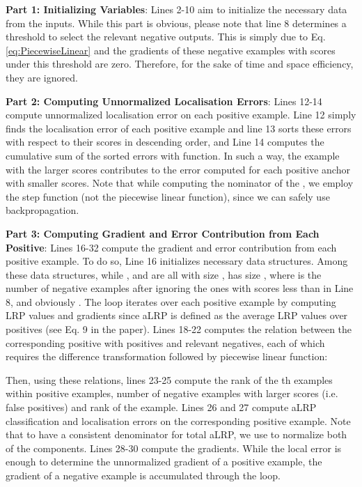 \documentclass{article}
\begin{document}
\textbf{Part 1: Initializing Variables}: Lines 2-10  aim to initialize the necessary data from the inputs. While this part is obvious, please note that line 8 determines a threshold to select the relevant negative outputs. This is simply due to Eq. \ref{eq:PiecewiseLinear} and the gradients of these negative examples with scores under this threshold are zero. Therefore, for the sake of time and space efficiency, they are ignored.

\textbf{Part 2: Computing Unnormalized Localisation Errors}: Lines 12-14 compute unnormalized localisation error on each positive example. Line 12 simply finds the localisation error of each positive example and line 13 sorts these errors with respect to their scores in descending order, and Line 14 computes the cumulative sum of the sorted errors with  function. In such a way, the example with the larger scores contributes to the error computed for each positive anchor with smaller scores. Note that while computing the nominator of the , we employ the step function (not the piecewise linear function), since we can safely use backpropagation. 

\textbf{Part 3: Computing Gradient and Error Contribution from Each Positive}: Lines 16-32 compute the gradient and error contribution from each positive example. To do so, Line 16 initializes necessary data structures. Among these data structures, while  ,  and  are all with size ,  has size , where  is the number of negative examples after ignoring the ones with scores less than  in Line 8, and obviously . The loop iterates over each positive example by computing LRP values and gradients since aLRP is defined as the average LRP values over positives (see Eq. 9 in the paper). Lines 18-22 computes the relation between the corresponding positive with positives and relevant negatives, each of which requires the difference transformation followed by piecewise linear function:

Then, using these relations, lines 23-25 compute the rank of the th examples within positive examples, number of negative examples with larger scores (i.e. false positives) and rank of the example. Lines 26 and 27 compute aLRP classification and localisation errors on the corresponding positive example. Note that to have a consistent denominator for total aLRP, we use  to normalize both of the components. Lines 28-30 compute the gradients. While the local error is enough to determine the unnormalized gradient of a positive example, the gradient of a negative example is accumulated through the loop.
\end{document}
